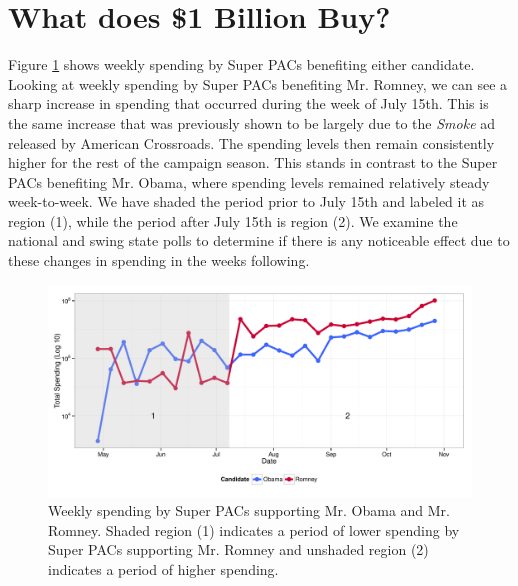 \documentclass[11pt]{article}\usepackage{graphicx, color}
\newenvironment{knitrout}{}{} %
\begin{document}
\section{What does \$1 Billion Buy?}
Figure \ref{fig:trend_plot} shows weekly spending by Super PACs benefiting either candidate. Looking at weekly spending by Super PACs benefiting Mr. Romney, we can see a sharp increase in spending that occurred during the week of July 15th. This is the same increase that was previously shown to be largely due to the \textit{Smoke} ad released by American Crossroads. The spending levels then remain consistently higher for the rest of the campaign season. This stands in contrast to the Super PACs benefiting Mr. Obama, where spending levels remained relatively steady week-to-week. We have shaded the period prior to July 15th and labeled it as region (1), while the period after July 15th is region (2). We examine the national and swing state polls to determine if there is any noticeable effect due to these changes in spending in the weeks following.

\begin{knitrout}
\color{fgcolor}\begin{figure}[H]


{\centering \includegraphics[width=\textwidth]{figure/trend_plot} 

}

\caption[Weekly spending by Super PACs supporting Mr]{Weekly spending by Super PACs supporting Mr. Obama and Mr. Romney. Shaded region (1) indicates a period of lower spending by Super PACs supporting Mr. Romney and unshaded region (2) indicates a period of higher spending.\label{fig:trend_plot}}
\end{figure}


\end{knitrout}
\end{document}
